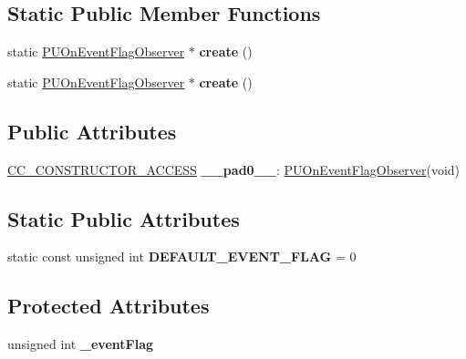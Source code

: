 \subsection*{Static Public Member Functions}
\begin{DoxyCompactItemize}
\item 
\mbox{\label{classPUOnEventFlagObserver_ad54d8ef4ab3e152120ea0c47c5c8f62f}} 
static \hyperlink{classPUOnEventFlagObserver}{P\+U\+On\+Event\+Flag\+Observer} $\ast$ {\bfseries create} ()
\item 
\mbox{\label{classPUOnEventFlagObserver_aa1c7d7a7f71f3a8aaeaae86ec1bc3c6f}} 
static \hyperlink{classPUOnEventFlagObserver}{P\+U\+On\+Event\+Flag\+Observer} $\ast$ {\bfseries create} ()
\end{DoxyCompactItemize}
\subsection*{Public Attributes}
\begin{DoxyCompactItemize}
\item 
\mbox{\label{classPUOnEventFlagObserver_ab18266e63270c80b7114bed0e9fdcc2f}} 
\hyperlink{_2cocos2d_2cocos_2base_2ccConfig_8h_a25ef1314f97c35a2ed3d029b0ead6da0}{C\+C\+\_\+\+C\+O\+N\+S\+T\+R\+U\+C\+T\+O\+R\+\_\+\+A\+C\+C\+E\+SS} {\bfseries \+\_\+\+\_\+pad0\+\_\+\+\_\+}\+: \hyperlink{classPUOnEventFlagObserver}{P\+U\+On\+Event\+Flag\+Observer}(void)
\end{DoxyCompactItemize}
\subsection*{Static Public Attributes}
\begin{DoxyCompactItemize}
\item 
\mbox{\label{classPUOnEventFlagObserver_a02b3f6a127be0eca74b530e89bc15f89}} 
static const unsigned int {\bfseries D\+E\+F\+A\+U\+L\+T\+\_\+\+E\+V\+E\+N\+T\+\_\+\+F\+L\+AG} = 0
\end{DoxyCompactItemize}
\subsection*{Protected Attributes}
\begin{DoxyCompactItemize}
\item 
\mbox{\label{classPUOnEventFlagObserver_a357d52cab07521a9e6e2f41da2f1eaba}} 
unsigned int {\bfseries \+\_\+event\+Flag}
\end{DoxyCompactItemize}
